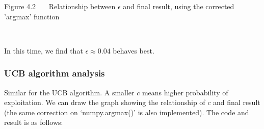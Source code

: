 \documentclass[11pt]{article}
\begin{document}
    \begin{center}

    \begin{small}
        Figure 4.2 \ \ \  Relationship between $\epsilon$ and final result, using the corrected 'argmax' function
    \end{small}
    \end{center}
    { \hspace*{\fill} \\}
    
    In this time, we find that \(\epsilon\approx 0.04\) behaves best.
\pagebreak
    \hypertarget{ucb-algorithm-analysis}{%
\subsubsection{UCB algorithm analysis}\label{ucb-algorithm-analysis}}

Similar for the UCB algorithm. A smaller \(c\) means higher probability
of exploitation. We can draw the graph showing the relationship of \(c\)
and final result (the same correction on `numpy.argmax()' is also
implemented). The code and result is as follows:
\end{document}
